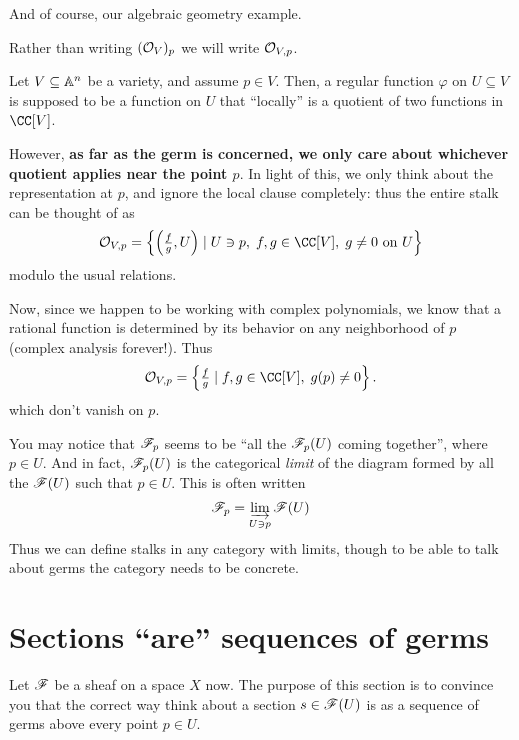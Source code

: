 And of course, our algebraic geometry example.
\begin{abuse}
	Rather than writing $(\mathcal O_V)_p$ we will write $\mathcal O_{V,p}$.
\end{abuse}
\begin{example}
	Let $V \subseteq \mathbb A^n$ be a variety, and assume $p \in V$.
	Then, a regular function $\varphi$ on $U \subseteq V$
	is supposed to be a function on $U$ that ``locally'' is a quotient
	of two functions in $\CC[V]$.

	However, \textbf{as far as the germ is concerned, we only care about
	whichever quotient applies near the point $p$}.
	In light of this, we only think about the representation at $p$,
	and ignore the local clause completely:
	thus the entire stalk can be thought of as
	\[
		\OO_{V,p} = 
		\left\{ \left( \tfrac fg , U \right) \mid 
			U \ni p, \; f,g \in \CC[V], \;
			\text{$g \neq 0$ on $U$} \right\}
	\]
	modulo the usual relations.

	Now, since we happen to be working with complex polynomials,
	we know that a rational function is determined by its
	behavior on any neighborhood of $p$
	(complex analysis forever!).
	Thus 
	\[
		\OO_{V,p} =
		\left\{ \tfrac fg \mid f,g \in \CC[V], \; g(p) \neq 0 \right\}.
	\]
	which don't vanish on $p$.
\end{example}

\begin{remark}
	You may notice that $\mathscr F_p$ seems to be
	``all the $\mathscr F_p(U)$ coming together'', where $p \in U$.
	And in fact, $\mathscr F_p(U)$ is the categorical \emph{limit}
	of the diagram formed by all the $\mathscr F(U)$ such that $p \in U$.
	This is often written
	\[ \mathscr F_p = \varinjlim_{U \ni p} \mathscr F(U) \]
	Thus we can define stalks in any category with limits,
	though to be able to talk about germs the category needs
	to be concrete.
\end{remark}

\section{Sections ``are'' sequences of germs}
Let $\mathscr F$ be a sheaf on a space $X$ now.
The purpose of this section is to convince you that the correct way 
think about a section $s \in \mathscr F(U)$ is as a sequence of germs
above every point $p \in U$.

